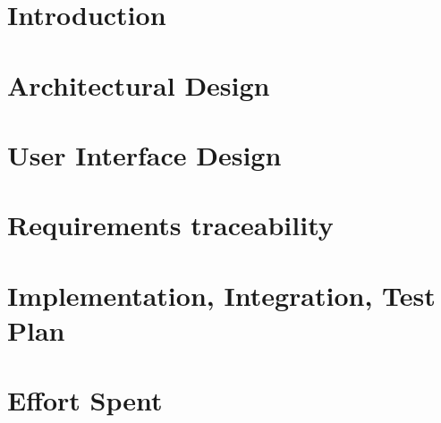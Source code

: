 \documentclass[table, 12pt]{article}
\begin{document}
\clearpage
{{\section{Introduction}}}
\label{sect:introduction}

\clearpage
{{\section{Architectural Design}}}
\label{sect:architectural}

\clearpage
{{\section{User Interface Design}}}
\label{sect:interface}

\clearpage
{{\section{Requirements traceability}}}
\label{sect:requirements_traceability}

\clearpage
{{\section{Implementation, Integration, Test Plan}}}
\label{sect:implementation}

\clearpage
{{\section{Effort Spent}}}
\label{sect:effort}

\end{document}
